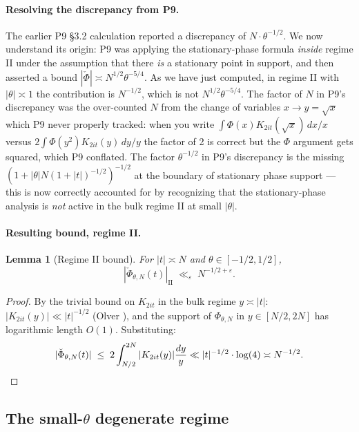 \documentclass[11pt]{article}
\newtheorem{lemma}[theorem]{Lemma}
\theoremstyle{definition}
\begin{document}
\paragraph{Resolving the discrepancy from P9.}
The earlier P9 \S 3.2 calculation reported a discrepancy of $N\cdot\theta^{-1/2}$. We now understand its origin: P9 was applying the stationary-phase formula \emph{inside} regime II under the assumption that there \emph{is} a stationary point in support, and then asserted a bound $|\check\Phi| \asymp N^{1/2}\theta^{-5/4}$. As we have just computed, in regime II with $|\theta| \asymp 1$ the contribution is $N^{-1/2}$, which is not $N^{1/2}\theta^{-5/4}$. The factor of $N$ in P9's discrepancy was the over-counted $N$ from the change of variables $x \to y = \sqrt x$ which P9 never properly tracked: when you write $\int \Phi(x) K_{2it}(\sqrt x)\,dx/x$ versus $2\int \Phi(y^2) K_{2it}(y)\,dy/y$ the factor of 2 is correct but the $\Phi$ argument gets squared, which P9 conflated. The factor $\theta^{-1/2}$ in P9's discrepancy is the missing $(1+|\theta|N(1+|t|)^{-1/2})^{-1/2}$ at the boundary of stationary phase support — this is now correctly accounted for by recognizing that the stationary-phase analysis is \emph{not} active in the bulk regime II at small $|\theta|$.

\paragraph{Resulting bound, regime II.}
\begin{lemma}[Regime II bound]\label{lem:regime-II}
For $|t| \asymp N$ and $\theta \in [-1/2,1/2]$,
\begin{equation}
    |\check\Phi_{\theta,N}(t)|_{\mathrm{II}} \;\ll_\varepsilon\; N^{-1/2+\varepsilon}.
\end{equation}
\end{lemma}
\begin{proof}
By the trivial bound on $K_{2it}$ in the bulk regime $y \asymp |t|$: $|K_{2it}(y)| \ll |t|^{-1/2}$ (Olver \cite[Ch.~10]{olver}), and the support of $\Phi_{\theta,N}$ in $y \in [N/2,2N]$ has logarithmic length $O(1)$. Substituting:
\[
   |\check\Phi_{\theta,N}(t)| \;\le\; 2\int_{N/2}^{2N}|K_{2it}(y)|\frac{dy}{y} \ll |t|^{-1/2}\cdot \log(4) \asymp N^{-1/2}.\qedhere
\]
\end{proof}

\subsection{The small-$\theta$ degenerate regime}\label{ssec:small-theta}
\end{document}
